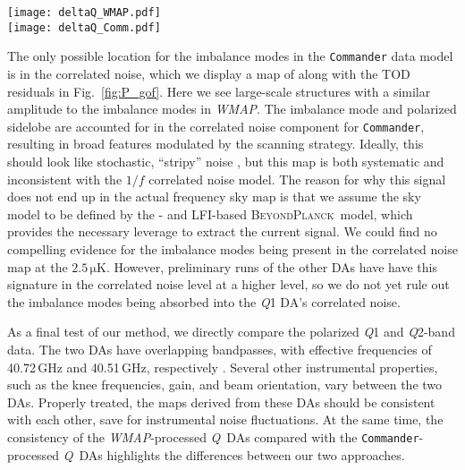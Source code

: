 \documentclass[twocolumn]{aa}
\def\WMAP{\emph{WMAP}}
\def\commander{\texttt{Commander}}
\newcommand{\BP}{\textsc{BeyondPlanck}}
\newcommand{\Q}[0]{\textit Q}
\begin{document}
\begin{figure*}
  \centering
	\texttt{[image: deltaQ\_WMAP.pdf]}\\
	\texttt{[image: deltaQ\_Comm.pdf]}
	\caption{Half-difference maps $(\mathit{Q}1-\mathit{Q}2)/2$, smoothed to $5^\circ$. (\emph{Top row:}) \WMAP\ 
	half-difference map. (\emph{Bottom row:}) \texttt{Commander} half-difference map. }
	\label{fig:P_qdiff}
\end{figure*}

The only possible location for the imbalance modes in the \texttt{Commander}
data model is in the correlated noise, which we display a map of along with the
TOD residuals in Fig.~\ref{fig:P_gof}.  Here we see large-scale structures with
a similar amplitude to the imbalance modes in \WMAP.  The imbalance mode and
polarized sidelobe are accounted for in the correlated noise component for
\commander, resulting in broad features modulated by the scanning strategy.
Ideally, this should look like stochastic, ``stripy'' noise \citep[see,
e.g.,][for an LFI example]{bp10}, but this map is both systematic and
inconsistent with the $1/f$ correlated noise model. The reason for why this
signal does not end up in the actual frequency sky map is that we assume the
sky model to be defined by the \Planck- and LFI-based \BP\ model, which
provides the necessary leverage to extract the current signal. We could find no
compelling evidence for the imbalance modes being present in the correlated
noise map at the $2.5\,\mathrm{\mu K}$. However, preliminary runs of the other
DAs have have this signature in the correlated noise level at a higher level,
so we do not yet rule out the imbalance modes being absorbed into the
\Q1 DA's correlated noise.


As a final test of our method, we directly compare the polarized \Q1 and
\Q2-band data. The two DAs have overlapping bandpasses, with effective
frequencies of 40.72\,GHz and 40.51\,GHz, respectively \citep{bennett2012}.
Several other instrumental properties, such as the knee frequencies, gain, and
beam orientation, vary between the two DAs. Properly treated, the maps derived
from these DAs should be consistent with each other, save for instrumental
noise fluctuations. At the same time, the consistency of the \WMAP-processed
\Q\ DAs compared with the \commander-processed \Q\ DAs highlights the
differences between our two approaches. 
\end{document}
